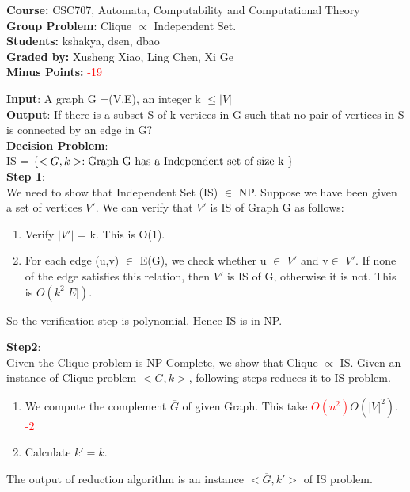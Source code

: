 \documentclass{article}%
\newcommand{\add}[1]{\textcolor{dkgreen}{#1}}
\newcommand{\rmv}[1]{\textcolor{red}{\sout{#1}}}
\begin{document}
\begin{flushleft}
\textbf{Course:} CSC707, Automata, Computability and Computational Theory\\
\textbf{Group Problem}: Clique $\propto$ Independent Set. \\
\textbf{Students:} kshakya, dsen, dbao\\
\textbf{Graded by:} Xusheng Xiao, Ling Chen, Xi Ge\\
\textbf{Minus Points:} \textcolor{red}{-19}
\end{flushleft}


\noindent{\hrulefill}

\bigskip


\begin{flushleft}
\textbf{Input}: A graph G =(V,E), an integer k $\leq \left | V \right |$ \\
\textbf{Output}: If there is a subset S of k vertices in G such that no pair of vertices in S is connected by an edge in G?\\

\textbf{Decision Problem}: \\
IS =  $\left \{ <  G,k > : \textup{Graph G has a Independent set of size k } \right \} $\\

\textbf{Step 1}:\\
We need to show that Independent Set (IS) $ \in $ NP. Suppose we have been given a set of 
vertices $V'$. We can verify that $V'$ is IS of Graph G as follows:\\
\begin{enumerate}
	\item Verify $\left | V' \right | $ = k. This is O(1).
	\item For each edge (u,v) $\in$ E(G), we check whether u $\in$ $V'$ and v$\in$ $V'$. If none of the edge satisfies this relation, then $V'$ is IS of G, otherwise it is not. This is $O(k^2\left |E\right |)$.
\end{enumerate}

So the verification step is polynomial. Hence IS is in NP.

\textbf{Step2}:\\
Given the Clique problem is NP-Complete, we show that Clique $\propto$ IS. Given an instance of Clique problem $<G,k>$, following steps reduces it to IS problem.\\
\begin{enumerate}
\item We compute the complement $\overline{G}$ of given Graph. This take \rmv{$O(n^2)$}\add{$O(|V|^2)$}. \textcolor{red}{-2}
\item Calculate $k'=k$.
\end{enumerate}
The output of reduction algorithm is an instance $<\overline{G},k'>$ of IS problem.


\end{flushleft}
\end{document}
